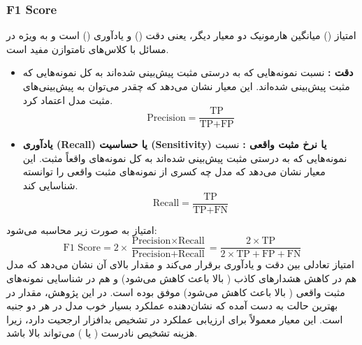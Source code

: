 \subsubsection{F1 Score}
امتیاز  () میانگین هارمونیک دو معیار دیگر، یعنی دقت () و یادآوری () است و به ویژه در مسائل با کلاس‌های نامتوازن مفید است.
\begin{itemize}
    \item \textbf{دقت :} نسبت نمونه‌هایی که به درستی مثبت پیش‌بینی شده‌اند به کل نمونه‌هایی که مثبت پیش‌بینی شده‌اند. این معیار نشان می‌دهد که چقدر می‌توان به پیش‌بینی‌های مثبت مدل اعتماد کرد.
    \[ \text{Precision} = \frac{\text{TP}}{\text{TP} + \text{FP}} \]
    \item \textbf{یادآوری (Recall) یا حساسیت (Sensitivity) یا نرخ مثبت واقعی :} نسبت نمونه‌هایی که به درستی مثبت پیش‌بینی شده‌اند به کل نمونه‌های واقعاً مثبت. این معیار نشان می‌دهد که مدل چه کسری از نمونه‌های مثبت واقعی را توانسته شناسایی کند.
    \[ \text{Recall} = \frac{\text{TP}}{\text{TP} + \text{FN}} \]
\end{itemize}
امتیاز  به صورت زیر محاسبه می‌شود:
\[ \text{F1 Score} = 2 \times \frac{\text{Precision} \times \text{Recall}}{\text{Precision} + \text{Recall}} = \frac{2 \times \text{TP}}{2 \times \text{TP} + \text{FP} + \text{FN}} \]
امتیاز  تعادلی بین دقت و یادآوری برقرار می‌کند و مقدار بالای آن نشان می‌دهد که مدل هم در کاهش هشدارهای کاذب ( بالا باعث کاهش  می‌شود) و هم در شناسایی نمونه‌های مثبت واقعی ( بالا باعث کاهش  می‌شود) موفق بوده است. در این پژوهش، مقدار   در بهترین حالت به دست آمده که نشان‌دهنده عملکرد بسیار خوب مدل در هر دو جنبه است. این معیار معمولاً برای ارزیابی عملکرد در تشخیص بدافزار ارجحیت دارد، زیرا هزینه تشخیص نادرست ( یا ) می‌تواند بالا باشد.

